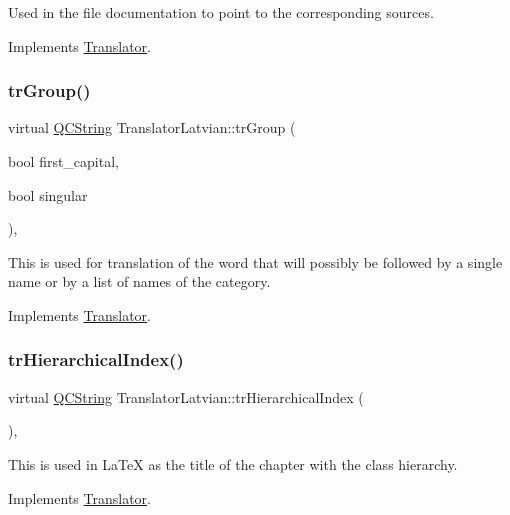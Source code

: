 Used in the file documentation to point to the corresponding sources. 

Implements \mbox{\hyperlink{class_translator}{Translator}}.

\mbox{\label{class_translator_latvian_ac06fda1845a57e2c95f8d9634d858214}} 
\subsubsection{\texorpdfstring{trGroup()}{trGroup()}}
{\footnotesize\ttfamily virtual \mbox{\hyperlink{class_q_c_string}{Q\+C\+String}} Translator\+Latvian\+::tr\+Group (\begin{DoxyParamCaption}\item[{bool}]{first\+\_\+capital,  }\item[{bool}]{singular }\end{DoxyParamCaption})\hspace{0.3cm}{\ttfamily [inline]}, {\ttfamily [virtual]}}

This is used for translation of the word that will possibly be followed by a single name or by a list of names of the category. 

Implements \mbox{\hyperlink{class_translator}{Translator}}.

\mbox{\label{class_translator_latvian_ac073d989a8d00ca9b96898f7e6b668a6}} 
\subsubsection{\texorpdfstring{trHierarchicalIndex()}{trHierarchicalIndex()}}
{\footnotesize\ttfamily virtual \mbox{\hyperlink{class_q_c_string}{Q\+C\+String}} Translator\+Latvian\+::tr\+Hierarchical\+Index (\begin{DoxyParamCaption}{ }\end{DoxyParamCaption})\hspace{0.3cm}{\ttfamily [inline]}, {\ttfamily [virtual]}}

This is used in La\+TeX as the title of the chapter with the class hierarchy. 

Implements \mbox{\hyperlink{class_translator}{Translator}}.


